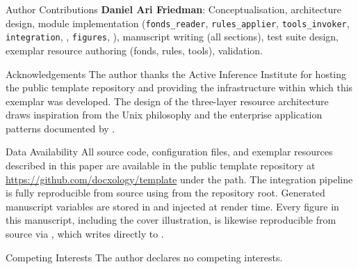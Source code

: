 \documentclass[
  ignorenonframetext,
]{beamer}
\begin{document}
\begin{frame}{Author Contributions}
\protect{}\label{author-contributions}
\textbf{Daniel Ari Friedman}: Conceptualisation, architecture design,
module implementation (\texttt{fonds\_reader}, \texttt{rules\_applier},
\texttt{tools\_invoker}, \texttt{integration},
, \texttt{figures},
), manuscript writing (all sections), test
suite design, exemplar resource authoring (fonds, rules, tools),
validation.
\end{frame}

\begin{frame}[allowframebreaks]{Acknowledgements}
\protect{}\label{acknowledgements}
The author thanks the Active Inference Institute for hosting the public
template repository and providing the infrastructure within which this
exemplar was developed. The design of the three-layer resource
architecture draws inspiration from the Unix philosophy
 and the enterprise application patterns documented
by .
\end{frame}

\begin{frame}{Data Availability}
\protect{}\label{data-availability}
All source code, configuration files, and exemplar resources described
in this paper are available in the public template repository at
\url{https://github.com/docxology/template} under the
 path. The
integration pipeline is fully reproducible from source using
from the repository root. Generated manuscript variables are stored in
 and injected at render
time. Every figure in this manuscript, including the cover illustration,
is likewise reproducible from source via
,
which writes directly to .
\end{frame}

\begin{frame}[allowframebreaks]{Competing Interests}
\protect{}\label{competing-interests}
The author declares no competing interests.
\end{frame}
\end{document}
